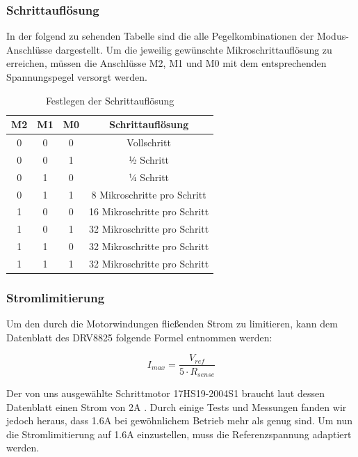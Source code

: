 \newpage
\subsubsection{Schrittauflösung}
In der folgend zu sehenden Tabelle sind die alle Pegelkombinationen der Modus-Anschlüsse dargestellt.
Um die jeweilig gewünschte Mikroschrittauflösung zu erreichen, müssen die Anschlüsse M2, M1 und M0 mit dem entsprechenden Spannungspegel versorgt werden.

\begin{table}[h]
    \centering
    \begin{tabular}{|c|c|c|c|}
        \hline
        \textbf{M2} & \textbf{M1} & \textbf{M0} & \textbf{Schrittauflösung}    \\ \hline
        0 & 0 & 0 & Vollschritt                  \\ \hline
        0 & 0 & 1 & ½ Schritt                    \\ \hline
        0 & 1 & 0 & ¼ Schritt                    \\ \hline
        0 & 1 & 1 & 8 Mikroschritte pro Schritt  \\ \hline
        1 & 0 & 0 & 16 Mikroschritte pro Schritt \\ \hline
        1 & 0 & 1 & 32 Mikroschritte pro Schritt \\ \hline
        1 & 1 & 0 & 32 Mikroschritte pro Schritt \\ \hline
        1 & 1 & 1 & 32 Mikroschritte pro Schritt \\ \hline
    \end{tabular}
    \caption{Festlegen der Schrittauflösung}
\end{table}

\subsubsection{Stromlimitierung}
\footnotemark[14]Um den durch die Motorwindungen fließenden Strom zu limitieren, kann dem Datenblatt des DRV8825 folgende Formel entnommen werden:

\begin{equation}
    I_{max} = \frac{V_{ref}} {5 \cdot R_{sense}}
\end{equation}

Der von uns ausgewählte Schrittmotor 17HS19-2004S1 braucht laut dessen Datenblatt einen Strom von 2A .
Durch einige Tests und Messungen fanden wir jedoch heraus, dass 1.6A bei gewöhnlichem Betrieb mehr als genug sind.
Um nun die Stromlimitierung auf 1.6A einzustellen, muss die Referenzspannung adaptiert werden.

